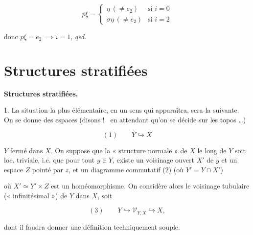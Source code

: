 \documentclass[11pt,a4paper]{article}
\begin{document}
\[
  p\xi = \begin{cases}
    \eta \ (\neq e_2) & \text{si } i = 0 \\
    \sigma\eta \ (\neq e_2) & \text{si } i = 2
  \end{cases}
\]

donc $p\xi = e_2 \implies i = 1$, \emph{qed}.


\section*{Structures stratifiées}



\textbf{Structures stratifiées.}

1. La situation la plus élémentaire, en un sens qui apparaîtra, sera la
suivante. On se donne des espaces (disons ! \ill\ en attendant qu'on se décide
sur les topos \ldots)

\[
  (1) \qquad Y \hookrightarrow X
\]

$Y$ fermé dans $X$. On suppose que la « structure normale » de $X$ le long de
$Y$ soit loc. triviale, i.e. que pour tout $y \in Y$, existe un voisinage
ouvert $X'$ de $y$ et un espace $Z$ pointé par $z$, et un diagramme commutatif
(2) (où $Y' = Y \cap X'$)


où $X' \simeq Y'\times Z$ est un homéomorphisme. On considère alors le
voisinage tubulaire (« infinitésimal ») de $Y$ dans $X$, soit

\[
  (3) \qquad Y \hookrightarrow \mathcal{V}_{Y,X} \hookrightarrow X ,
\]

dont il faudra donner une définition  techniquement souple.
\end{document}
